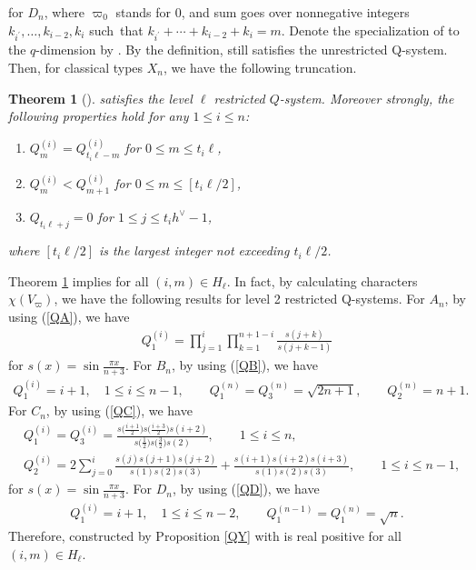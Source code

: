 \documentclass[pdftex]{sigma}
\numberwithin{equation}{section}
\newtheorem{Theorem}{Theorem}[section]
\begin{document}
for $D_n$, where $\varpi_0$ stands for 0, and sum goes over nonnegative integers $k_{i^\prime},\dots,k_{i-2},k_i$ such~that $k_{i^\prime}+\cdots+k_{i-2}+k_i=m$.
Denote the specialization of  to the $q$-dimension by .
By the definition,  still satisfies the unrestricted Q-system.
Then, for classical types $X_n$, we have the following truncation.
	\begin{Theorem}[{\cite{L,L2}}]\label{Qsol}
	 satisfies the level $\ell$ restricted $Q$-system.
	Moreover strongly, the following properties hold for any $1\leq i\leq n$:
			\begin{enumerate}\itemsep=0pt
			\item[$1)$] $Q_m^{(i)}=Q_{t_i\ell-m}^{(i)}$ for $0\leq m\leq t_i\ell$,
			\item[$2)$] $Q_m^{(i)}<Q_{m+1}^{(i)}$ for $0\leq m\leq[t_i\ell/2]$,
			\item[$3)$] $Q_{t_i\ell+j}=0$ for $1\leq j\leq t_ih^\vee-1$,
			\end{enumerate}
	where $[t_i\ell/2]$ is the largest integer not exceeding $t_i\ell/2$.
	\end{Theorem}
Theorem \ref{Qsol} implies  for all $(i,m)\in H_\ell$.
In fact, by calculating characters $\chi(V_{\varpi})$, we have the following results for level 2 restricted Q-systems.
For $A_n$, by using (\ref{QA}), we have
	\begin{align*}%
	Q_1^{(i)}=\prod_{j=1}^i\prod_{k=1}^{n+1-i}\frac{s(j+k)}{s(j+k-1)}
	\end{align*}
for $s(x)=\sin{\frac{\pi x}{n+3}}$.
For $B_n$, by using (\ref{QB}), we have
	\begin{align}\label{SQB}
	Q_1^{(i)}=i+1,\quad 1\leq i\leq n-1,\qquad Q_1^{(n)}=Q_3^{(n)}=\sqrt{2n+1},\qquad Q_2^{(n)}=n+1.
	\end{align}
For $C_n$, by using (\ref{QC}), we have
	\begin{align}\label{SQC}
	&Q_1^{(i)}=Q_3^{(i)}=\frac{s\bigl(\frac{i+1}{2}\bigr)s\bigl(\frac{i+3}{2}\bigr)s(i+2)}{s\bigl(\frac{1}{2}\bigr)s\bigl(\frac{3}{2}\bigr)s(2)},\qquad 1\leq i\leq n ,\\
	\label{SQC2}
	&Q_2^{(i)}=2\sum_{j=0}^i\frac{s(j)s(j+1)s(j+2)}{s(1)s(2)s(3)}+\frac{s(i+1)s(i+2)s(i+3)}{s(1)s(2)s(3)},\qquad 1\leq i\leq n-1,
	\end{align}
for $s(x)=\sin{\frac{\pi x}{n+3}}$.
For $D_n$, by using (\ref{QD}), we have
	\begin{align}\label{SQD}
	Q_1^{(i)}=i+1,\quad 1\leq i\leq n-2 ,\qquad Q_1^{(n-1)}=Q_1^{(n)}=\sqrt{n}.
	\end{align}
Therefore,  constructed by Proposition \ref{QY} with  is real positive for all~$(i,m)\in H_\ell$.
\end{document}
